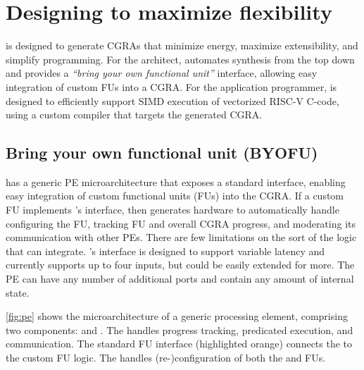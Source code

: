 \section{Designing \snafuframe to maximize flexibility}
\label{snafu:flexible}

\snafuframe is designed to generate CGRAs that minimize energy, maximize
extensibility, and simplify programming. 
%
For the architect, \snafuframe automates synthesis from the top down and
provides a \emph{``bring your own functional unit''} interface, allowing easy
integration of custom FUs into a CGRA.
% 
For the application programmer, \snafuframe is designed to efficiently support
SIMD execution of vectorized \mbox{RISC-V} C-code, using a custom compiler that targets the generated CGRA. 

\figSNAFUPE

\subsection{Bring your own functional unit (BYOFU)}
\label{snafu:flexible:byofu}
\snafuframe has a generic PE microarchitecture that exposes a
standard interface, enabling easy integration of custom functional units
(FUs) into the CGRA.
%
If a custom FU implements \snafuframe's interface, then \snafu generates hardware
to automatically handle configuring the FU, tracking FU and
overall CGRA progress, and moderating its communication with other PEs.
% 
There are few limitations on the sort of the logic that \snafuframe can integrate.
% 
\snafuframe's interface is designed to support variable latency and currently supports up to four inputs, but could be easily extended for more.
% 
The PE can have any number of additional ports and contain any amount of internal state.

\autoref{fig:pe} shows the microarchitecture of a generic \snafuframe processing element,
comprising two components: \ucore and \ucfg.
%
The \ucore handles progress tracking, predicated execution, and communication. 
%
The standard FU interface (highlighted orange) connects the
\ucore to the custom FU logic.  
%
The \ucfg handles (re-)configuration of both the \ucore and FUs.


